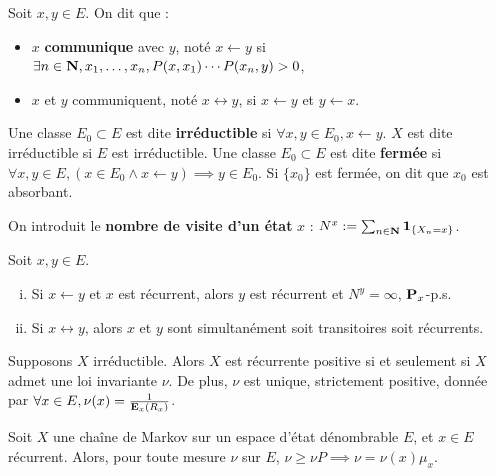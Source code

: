 \begin{defn}
	Soit $x, y \in E$.
	On dit que :
	\begin{itemize}
		\item[\textbullet] $x$ \textbf{communique} avec $y$, noté $x \leftarrow y$ si $\exists n \in \mathbf{N}, x_1,\ldots,x_n, P(x,x_1) \cdots P(x_n,y) > 0$,
		\item[\textbullet] $x$ et $y$ communiquent, noté $x \leftrightarrow y$, si $x \leftarrow y$ et $y \leftarrow x$.
	\end{itemize}
\end{defn}

\begin{defn}
	Une classe $E_0 \subset E$ est dite \textbf{irréductible} si $\forall x,y \in E_0, x \leftarrow y$.
	$X$ est dite irréductible si $E$ est irréductible.
	Une classe $E_0 \subset E$ est dite \textbf{fermée} si $\forall x,y \in E, (x \in E_0 \wedge x \leftarrow y) \implies y \in E_0$.
	Si $\{ x_0 \}$ est fermée, on dit que $x_0$ est absorbant.
\end{defn}

On introduit le \textbf{nombre de visite d'un état} $x$ : $N^x := \sum_{n \in \mathbf{N}} \operatorname{\mathbf{1}}_{\{ X_n = x \} }$.

\begin{pop}
	Soit $x,y \in E$.
	\begin{enumerate}[(i)]
		\item Si $x \leftarrow y$ et $x$ est récurrent, alors $y$ est récurrent et $N^y = \infty$, $\mathbf{P}_x$-p.s.
		\item Si $x \leftrightarrow y$, alors $x$ et $y$ sont simultanément soit transitoires soit récurrents.
	\end{enumerate}
\end{pop}

\begin{thm}
	Supposons $X$ irréductible.
	Alors $X$ est récurrente positive si et seulement si $X$ admet une loi invariante $\nu$.
	De plus, $\nu$ est unique, strictement positive, donnée par $\forall x \in E, \nu(x) = \frac{1}{\mathbf{E}_x(R_x)}$.
\end{thm}

\begin{pop}
	Soit $X$ une chaîne de Markov sur un espace d'état dénombrable $E$, et $x \in E$ récurrent.
	Alors, pour toute mesure $\nu$ sur $E$, $\nu \geq \nu P \implies \nu = \nu(x) \mu_x$.
\end{pop}
